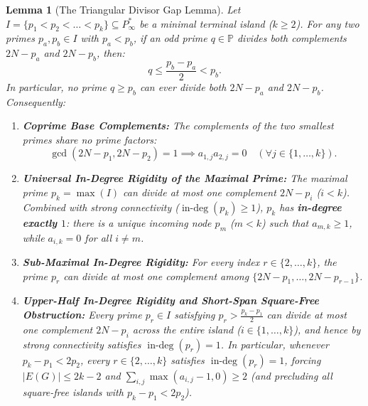 \documentclass[11pt,a4paper]{article}
\newtheorem{lemma}[theorem]{Lemma}
\theoremstyle{definition}
\begin{document}
\begin{lemma}[The Triangular Divisor Gap Lemma]
\label{lem:triangular_gap}
Let $I = \{p_1 < p_2 < \dots < p_k\} \subseteq P^*_\infty$ be a minimal terminal island ($k \ge 2$). For any two primes $p_a, p_b \in I$ with $p_a < p_b$, if an odd prime $q \in \mathbb{P}$ divides both complements $2N - p_a$ and $2N - p_b$, then:
\[
q \le \frac{p_b - p_a}{2} < p_b.
\]
In particular, no prime $q \ge p_b$ can ever divide both $2N - p_a$ and $2N - p_b$. Consequently:
\begin{enumerate}
    \item \textbf{Coprime Base Complements:} The complements of the two smallest primes share no prime factors:
    \[
    \gcd(2N - p_1, 2N - p_2) = 1 \implies a_{1,j} a_{2,j} = 0 \quad (\forall j \in \{1, \dots, k\}).
    \]
    \item \textbf{Universal In-Degree Rigidity of the Maximal Prime:} The maximal prime $p_k = \max(I)$ can divide at most one complement $2N - p_i$ ($i < k$). Combined with strong connectivity ($\operatorname{in-deg}(p_k) \ge 1$), $p_k$ has \textbf{in-degree exactly $1$}: there is a unique incoming node $p_m$ ($m < k$) such that $a_{m,k} \ge 1$, while $a_{i,k} = 0$ for all $i \ne m$.
    \item \textbf{Sub-Maximal In-Degree Rigidity:} For every index $r \in \{2, \dots, k\}$, the prime $p_r$ can divide at most one complement among $\{2N - p_1, \dots, 2N - p_{r-1}\}$.
    \item \textbf{Upper-Half In-Degree Rigidity and Short-Span Square-Free Obstruction:} Every prime $p_r \in I$ satisfying $p_r > \frac{p_k - p_1}{2}$ can divide at most one complement $2N - p_i$ across the entire island ($i \in \{1, \dots, k\}$), and hence by strong connectivity satisfies $\operatorname{in-deg}(p_r) = 1$. In particular, whenever $p_k - p_1 < 2p_2$, every $r \in \{2, \dots, k\}$ satisfies $\operatorname{in-deg}(p_r) = 1$, forcing $|E(G)| \le 2k - 2$ and $\sum_{i,j} \max(a_{i,j} - 1, 0) \ge 2$ (and precluding all square-free islands with $p_k - p_1 < 2p_2$).
\end{enumerate}
\end{lemma}
\end{document}
